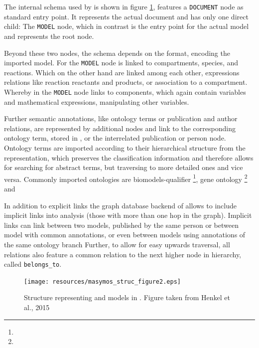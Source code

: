 The internal schema used by \masymos is shown in figure \ref{fig:background:graph-db:masymos}, features a \texttt{DOCUMENT} node as standard entry point. It represents the actual \xml document and has only one direct child: The \texttt{MODEL} node, which in contrast is the entry point for the actual model and represents the \xml root node.

Beyond these two nodes, the schema depends on the format, encoding the imported model. For \sbml the \texttt{MODEL} node is linked to compartments, species, and reactions. Which on the other hand are linked among each other, expressions relations like reaction reactants and products, or association to a compartment.
Whereby in \cellml the \texttt{MODEL} node links to components, which again contain variables and mathematical expressions, manipulating other variables.

Further semantic annotations, like ontology terms or publication and author relations, are represented by additional nodes and link to the corresponding ontology term, stored in \neoj, or the interrelated publication or person node. 
Ontology terms are imported according to their hierarchical structure from the \owl representation, which preserves the classification information and therefore allows for searching for abstract terms, but traversing to more detailed ones and vice versa.
Commonly imported ontologies are biomodels-qualifier \footnote{}, gene ontology \footnote{} and 

In addition to explicit links the graph database backend of \masymos allows to include implicit links into analysis (those with more than one hop in the graph). Implicit links can link between two models, published by the same person or between model with common annotations, or even between models using annotations of the same ontology branch
Further, to allow for easy upwards traversal, all relations also feature a common relation to the next higher node in hierarchy, called \texttt{belongs\_to}.

\begin{figure}
	\centering
	\texttt{[image: resources/masymos\_struc\_figure2.eps]}
	\caption{Structure representing \sbml and \cellml models in \masymos. Figure taken from Henkel et al., 2015 \cite{Henkel2015}}
	\label{fig:background:graph-db:masymos}
\end{figure}

